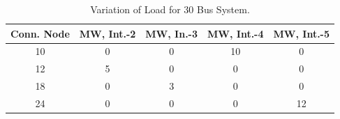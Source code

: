 \documentclass[preprint,12pt,3p]{elsarticle}
\begin{document}
	\begin{table}[ht] 
		
		\caption{Variation of Load for 30 Bus System.} %
		
		\centering %
		
		\begin{tabular}{| c | c | c | c | c |} %
			
			\hline\hline %
			
			Conn. Node & MW, Int.-2 & MW, In.-3 & MW, Int.-4  & MW, Int.-5 \\ [0.5ex] %
			
			
			\hline %
			
			10 &	0 &	0 &	10 &	0 \\ %
			\hline
			12 &	5 &	0 &	0 &	0 \\ %
			\hline
			18 &	0 &	3 &	0 &	0 \\ %
			\hline
			24 &	0 &	0 &	0 &	12 \\ %
			\hline
		\end{tabular} 
		
		\label{table:30LASCOPFLoadModified} %
		
	\end{table}
\end{document}
